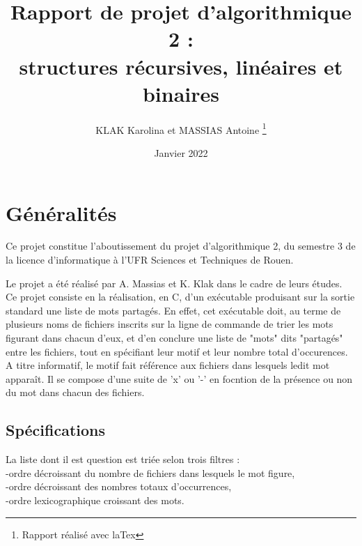 \documentclass[12pt, letterpaper]{report}
\title{Rapport de projet d'algorithmique 2 : 
\\structures récursives, linéaires et binaires}
\author{KLAK Karolina et MASSIAS Antoine \thanks 
{Rapport réalisé avec laTex} }
\date {Janvier 2022}
\begin{document}
\begin{titlepage}
    \maketitle
\end{titlepage}


\tableofcontents

\chapter{Généralités}

Ce projet constitue l'aboutissement du projet
d'algorithmique 2, du semestre 3 de la licence 
d'informatique à l'UFR Sciences et Techniques de Rouen.


Le projet a été réalisé par A. Massias et K. Klak dans le cadre de leurs études.
Ce projet consiste en la réalisation, en C, d'un exécutable produisant sur la sortie
 standard une liste de mots partagés. En effet, cet exécutable doit,
  au terme de plusieurs noms de fichiers inscrits sur la ligne de commande de trier les mots figurant dans chacun d'eux, 
  et d'en conclure une liste de "mots" dits "partagés" entre les fichiers, tout en spécifiant leur motif et leur nombre total d'occurences.
  A titre informatif, le motif fait référence aux fichiers dans lesquels ledit mot apparaît.
  Il se compose d'une suite de 'x' ou '-' en focntion de la présence ou non du mot dans chacun des fichiers.
\section{Spécifications}
La liste dont il est question est triée selon trois filtres : 
\\-ordre décroissant du nombre de fichiers dans lesquels le mot figure,
\\-ordre décroissant des nombres totaux d'occurrences,
\\-ordre lexicographique croissant des mots.
\end{document}

